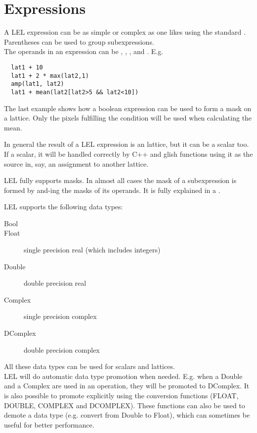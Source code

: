 \section{\label{LEL:EXPRESSIONS}Expressions}
A LEL expression can be as simple or complex as one likes
using the standard
.
Parentheses can be used to group subexpressions.
\\The operands in an expression can be
,
,
, and
.
E.g.
\begin{verbatim}
  lat1 + 10
  lat1 + 2 * max(lat2,1)
  amp(lat1, lat2)
  lat1 + mean(lat2[lat2>5 && lat2<10])
\end{verbatim}
The last example shows how a boolean expression can be used to form
a mask on a lattice. Only the pixels fulfilling the condition will be
used when calculating the mean.

In general the result of a LEL expression is an lattice, but it
can be a scalar too. If a scalar, it will be handled correctly
by C++ and glish functions using it as the source in, say, an
assignment to another lattice.

LEL fully supports masks. In almost all cases the mask of a
subexpression is formed by and-ing the masks of its operands.
It is fully explained in a .


\label{LEL:DATATYPES}
LEL supports the following data types:
\begin{description}
  \item[ Bool]
  \item[ Float] single precision real (which includes integers)
  \item[ Double] double precision real
  \item[ Complex ] single precision complex
  \item[ DComplex ] double precision complex
\end{description}
All these data types can be used for scalars and lattices.
\\LEL will do automatic data type promotion when needed. E.g. when
a Double and a Complex are used in an operation, they will be promoted
to DComplex. It is also possible to promote explicitly using the
conversion functions (FLOAT, DOUBLE, COMPLEX and DCOMPLEX).
These functions can also be used to demote a data type
(e.g. convert from Double to Float), which can sometimes
be useful for better performance.


